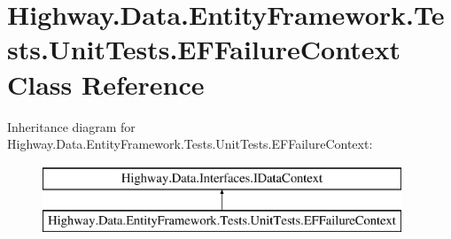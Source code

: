 \hypertarget{class_highway_1_1_data_1_1_entity_framework_1_1_tests_1_1_unit_tests_1_1_e_f_failure_context}{\section{Highway.\-Data.\-Entity\-Framework.\-Tests.\-Unit\-Tests.\-E\-F\-Failure\-Context Class Reference}
\label{class_highway_1_1_data_1_1_entity_framework_1_1_tests_1_1_unit_tests_1_1_e_f_failure_context}
}
Inheritance diagram for Highway.\-Data.\-Entity\-Framework.\-Tests.\-Unit\-Tests.\-E\-F\-Failure\-Context\-:\begin{figure}[H]
\begin{center}
\leavevmode
\includegraphics[height=2.000000cm]{class_highway_1_1_data_1_1_entity_framework_1_1_tests_1_1_unit_tests_1_1_e_f_failure_context}
\end{center}
\end{figure}
